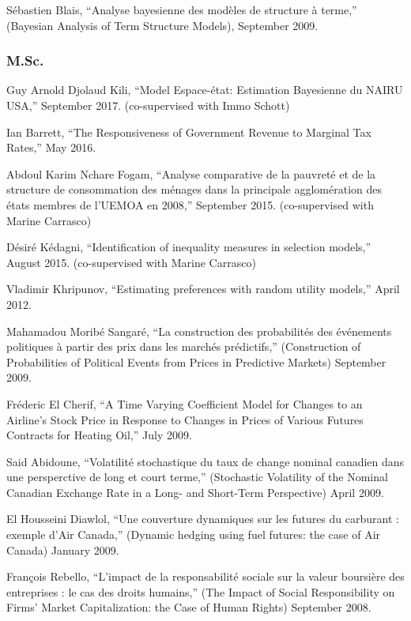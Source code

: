 \documentclass[12pt]{article}
\begin{document}
S\'ebastien Blais,
``Analyse bayesienne des mod\`eles de structure \`a terme,''
(Bayesian Analysis of Term Structure Models),
September 2009.

\subsubsection*{M.Sc.}

Guy Arnold Djolaud Kili,
``Model Espace-\'etat: Estimation Bayesienne du NAIRU USA,''
September 2017. (co-supervised with Immo Schott)

Ian Barrett,
``The Responsiveness of Government Revenue to Marginal Tax Rates,''
May 2016.

Abdoul Karim Nchare Fogam,
``Analyse comparative de la pauvret\'e et de la structure de consommation des m\'enages dans la principale agglom\'eration des \'etats membres de l’UEMOA en 2008,''
September 2015. (co-supervised with Marine Carrasco)

D\'esir\'e K\'edagni,
``Identification of inequality measures in selection models,''
August 2015. (co-supervised with Marine Carrasco)

Vladimir Khripunov,
``Estimating preferences with random utility models,''
April 2012.

Mahamadou Morib\'e Sangar\'e,
``La construction des probabilit\'es des \'ev\'enements politiques \`a 
partir des prix dans les march\'es pr\'edictifs,''
(Construction of Probabilities of Political Events from Prices in Predictive Markets)
September 2009.

Fr\'ederic El Cherif,
``A Time Varying Coefficient Model for Changes to an Airline's Stock Price in 
Response to Changes in Prices of Various Futures Contracts for Heating Oil,''
July 2009.

Said Abidoune,
``Volatilit\'e stochastique du taux de change nominal canadien dans une persperctive de long et court terme,''
(Stochastic Volatility of the Nominal Canadian Exchange Rate in a Long- and Short-Term Perspective)
April 2009.

El Housseini Diawlol,
``Une couverture dynamiques sur les futures du carburant : exemple d'Air Canada,''
(Dynamic hedging using fuel futures: the case of Air Canada)
January 2009.

Fran\c{c}ois Rebello,
``L'impact de la responsabilit\'e sociale sur la valeur boursi\`ere des entreprises : le cas des droits humains,''
(The Impact of Social Responsibility on Firms' Market Capitalization: the Case of Human Rights)
September 2008.
\end{document}
